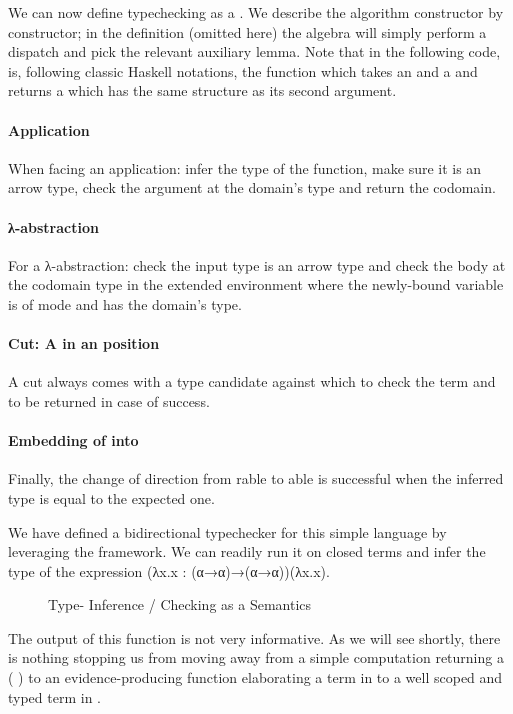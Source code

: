 We can now define typechecking as a \semrec{}. We describe the algorithm constructor
by constructor; in the  definition (omitted here) the algebra will
simply perform a dispatch and pick the relevant auxiliary lemma. Note that in the
following code, \AF{\_<\$\_} is, following classic Haskell notations, the function
which takes an  and a { } and returns a { }
which has the same structure as its second argument.

\paragraph{Application} When facing an application: infer the type of the function,
make sure it is an arrow type, check the argument at the domain's type and return
the codomain.
\paragraph{λ-abstraction} For a λ-abstraction: check the input
type is an arrow type and check the body at the codomain type in the extended
environment where the newly-bound variable is of mode  and has the
domain's type.
\paragraph{Cut: A  in an  position} A cut always comes
with a type candidate against which to check the term and to be returned in
case of success.
\paragraph{Embedding of  into } Finally, the change of
direction from rable to able is successful when the
inferred type is equal to the expected one.

We have defined a bidirectional typechecker for this simple language by
leveraging the \semrec{}framework. We can readily run it on closed terms
and infer the type of the expression (λx.x : (α→α)→(α→α))(λx.x).

\begin{figure}[h]
\begin{minipage}{0.35\textwidth}
\end{minipage}\hfill
\begin{minipage}{0.55\textwidth}
\end{minipage}
\caption{Type- Inference / Checking as a Semantics}
\end{figure}

The output of this function is not very informative. As we will see shortly,
there is nothing stopping us from moving away from a simple computation
returning a {( )} to an evidence-producing function
elaborating a term in  to a well scoped and typed term in .

